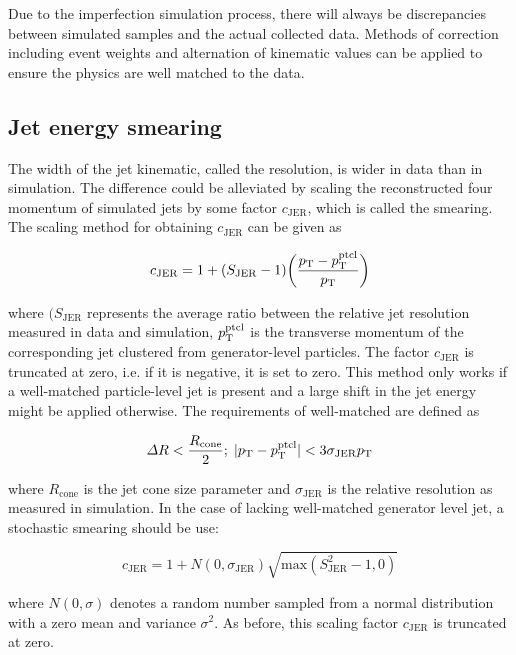 Due to the imperfection simulation process, there will always be discrepancies between simulated samples and the actual collected data.
Methods of correction including event weights and alternation of kinematic values can be applied to ensure the physics are well matched to the data.

\subsection{Jet energy smearing}
The width of the jet kinematic, called the resolution, is wider in data than in simulation.
The difference could be alleviated by scaling the reconstructed four momentum of simulated jets by some factor $c_{\mathrm{JER}}$, which is called the smearing.
The scaling method for obtaining $c_{\mathrm{JER}}$ can be given as
\begin{linenomath}\begin{equation}\label{eq:data_smear}
    c_{\mathrm{JER}} = 1 + (S_{\mathrm{JER}}-1)\biggl(\frac{p_{\mathrm{T}}-p_{\mathrm{T}}^{\mathrm{ptcl}}}{p_{\mathrm{T}}}\biggr)
\end{equation}\end{linenomath}
where $(S_{\mathrm{JER}}$ represents the average ratio between the relative jet resolution measured in data and simulation, $p_{\mathrm{T}}^{\mathrm{ptcl}}$ is the transverse momentum of the corresponding jet clustered from generator-level particles.
The factor $c_{\mathrm{JER}}$ is truncated at zero, i.e. if it is negative, it is set to zero. 
This method only works if a well-matched particle-level jet is present and a large shift in the jet energy might be applied otherwise.
The requirements of well-matched are defined as
\begin{linenomath}\begin{equation}\label{eq:data_wellmatched}
    \Delta R < \frac{R_{\mathrm{cone}}}{2};\; |p_{\mathrm{T}}-p_{\mathrm{T}}^{\mathrm{ptcl}}|<3\sigma_{\mathrm{JER}}p_{\mathrm{T}}
\end{equation}\end{linenomath}
where $R_{\mathrm{cone}}$ is the jet cone size parameter and $\sigma_{\mathrm{JER}}$ is the relative \PT resolution as measured in simulation.
In the case of lacking well-matched generator level jet, a stochastic smearing should be use:
\begin{linenomath}\begin{equation}\label{eq:data_stochastic}
    c_{\mathrm{JER}} = 1 + N(0, \sigma_{\mathrm{JER}}) \sqrt{\mathrm{max}(S_{\mathrm{JER}}^2-1,0)}
\end{equation}\end{linenomath}
where $N(0,\sigma)$ denotes a random number sampled from a normal distribution with a zero mean and variance $\sigma^2$.
As before, this scaling factor $c_{\mathrm{JER}}$ is truncated at zero.

